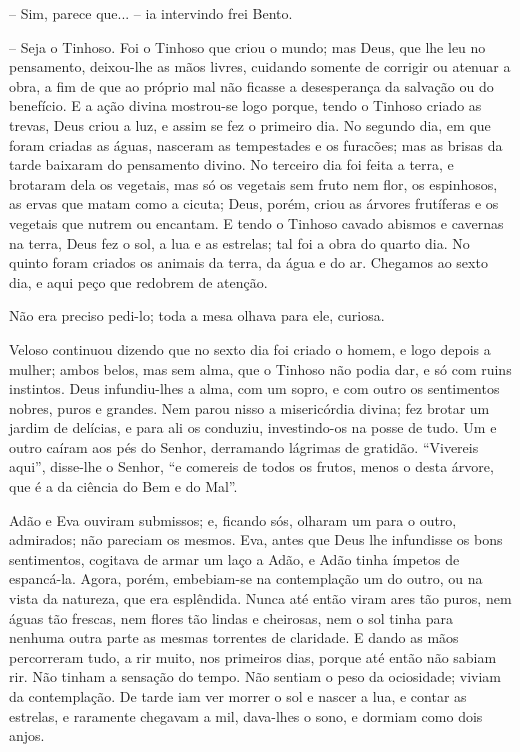 -- Sim, parece que... -- ia intervindo frei Bento.

-- Seja o Tinhoso. Foi o Tinhoso que criou o mundo; mas Deus, que lhe
leu no pensamento, deixou-lhe as mãos livres, cuidando somente de
corrigir ou atenuar a obra, a fim de que ao próprio mal não ficasse a
desesperança da salvação ou do benefício. E a ação divina mostrou-se
logo porque, tendo o Tinhoso criado as trevas, Deus criou a luz, e assim
se fez o primeiro dia. No segundo dia, em que foram criadas as águas,
nasceram as tempestades e os furacões; mas as brisas da tarde baixaram
do pensamento divino. No terceiro dia foi feita a terra, e brotaram dela
os vegetais, mas só os vegetais sem fruto nem flor, os espinhosos, as
ervas que matam como a cicuta; Deus, porém, criou as árvores frutíferas
e os vegetais que nutrem ou encantam. E tendo o Tinhoso cavado abismos e
cavernas na terra, Deus fez o sol, a lua e as estrelas; tal foi a obra
do quarto dia. No quinto foram criados os animais da terra, da água e do
ar. Chegamos ao sexto dia, e aqui peço que redobrem de atenção.

Não era preciso pedi-lo; toda a mesa olhava para ele, curiosa.

Veloso continuou dizendo que no sexto dia foi criado o homem, e logo
depois a mulher; ambos belos, mas sem alma, que o Tinhoso não podia dar,
e só com ruins instintos. Deus infundiu-lhes a alma, com um sopro, e com
outro os sentimentos nobres, puros e grandes. Nem parou nisso a
misericórdia divina; fez brotar um jardim de delícias, e para ali os
conduziu, investindo-os na posse de tudo. Um e outro caíram aos pés do
Senhor, derramando lágrimas de gratidão. ``Vivereis aqui'', disse-lhe o
Senhor, ``e comereis de todos os frutos, menos o desta árvore, que é a
da ciência do Bem e do Mal''.

Adão e Eva ouviram submissos; e, ficando sós, olharam um para o outro,
admirados; não pareciam os mesmos. Eva, antes que Deus lhe infundisse os
bons sentimentos, cogitava de armar um laço a Adão, e Adão tinha ímpetos
de espancá-la. Agora, porém, embebiam-se na contemplação um do outro, ou
na vista da natureza, que era esplêndida. Nunca até então viram ares tão
puros, nem águas tão frescas, nem flores tão lindas e cheirosas, nem o
sol tinha para nenhuma outra parte as mesmas torrentes de claridade. E
dando as mãos percorreram tudo, a rir muito, nos primeiros dias, porque
até então não sabiam rir. Não tinham a sensação do tempo. Não sentiam o
peso da ociosidade; viviam da contemplação. De tarde iam ver morrer o
sol e nascer a lua, e contar as estrelas, e raramente chegavam a mil,
dava-lhes o sono, e dormiam como dois anjos.

